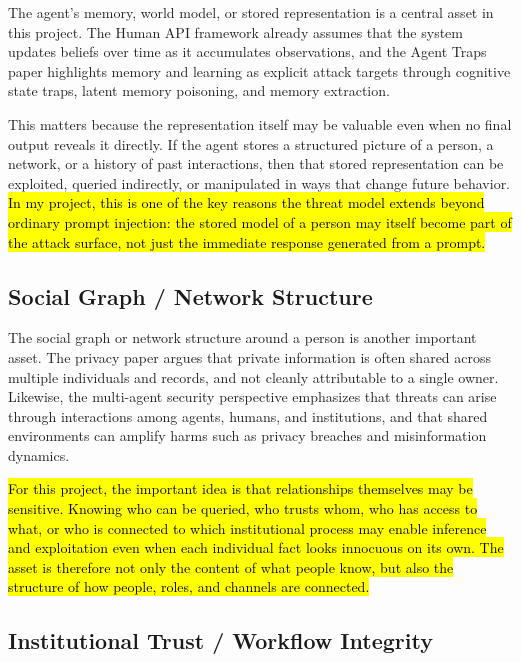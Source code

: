 \documentclass[11pt]{article}
\begin{document}
The agent's memory, world model, or stored representation is a central asset in this project. The Human API framework already assumes that the system updates beliefs over time as it accumulates observations, and the Agent Traps paper highlights memory and learning as explicit attack targets through cognitive state traps, latent memory poisoning, and memory extraction. \citep{oliver2026humanapi,franklin2026agenttraps}

This matters because the representation itself may be valuable even when no final output reveals it directly. If the agent stores a structured picture of a person, a network, or a history of past interactions, then that stored representation can be exploited, queried indirectly, or manipulated in ways that change future behavior. \hl{In my project, this is one of the key reasons the threat model extends beyond ordinary prompt injection: the stored model of a person may itself become part of the attack surface, not just the immediate response generated from a prompt.}

\subsection{Social Graph / Network Structure}

The social graph or network structure around a person is another important asset. The privacy paper argues that private information is often shared across multiple individuals and records, and not cleanly attributable to a single owner. Likewise, the multi-agent security perspective emphasizes that threats can arise through interactions among agents, humans, and institutions, and that shared environments can amplify harms such as privacy breaches and misinformation dynamics. \citep{brown2022privacylm,schroeder2025multiagentsecurity}

\hl{For this project, the important idea is that relationships themselves may be sensitive. Knowing who can be queried, who trusts whom, who has access to what, or who is connected to which institutional process may enable inference and exploitation even when each individual fact looks innocuous on its own. The asset is therefore not only the content of what people know, but also the structure of how people, roles, and channels are connected.}

\subsection{Institutional Trust / Workflow Integrity}
\end{document}

